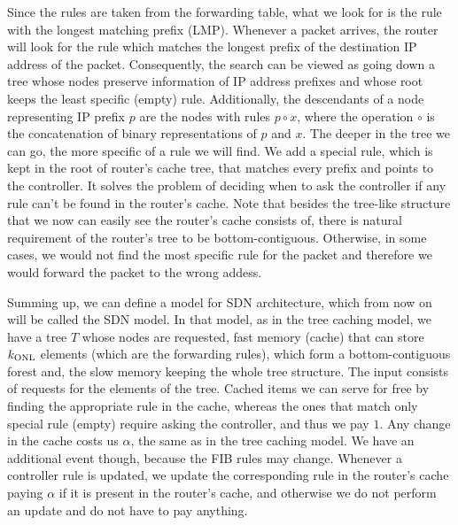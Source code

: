 Since the rules are taken from the forwarding table, what we look for is the
rule with the longest matching prefix (LMP). Whenever a packet arrives, the
router will look for the rule which matches the longest prefix of the
destination IP address of the packet. Consequently, the search can be viewed as
going down a tree whose nodes preserve information of IP address prefixes and whose
root keeps the least specific (empty) rule. Additionally, the descendants of a node
representing IP prefix $p$ are the nodes with rules $p \circ x$, where the operation
$\circ$ is the concatenation of binary representations of $p$ and $x$. The deeper in
the tree we can go, the more specific of a rule we will find. We add a special rule,
which is kept in the root of router's cache tree, that matches every prefix and
points to the controller. It solves the problem of deciding when to ask the
controller if any rule can't be found in the router's cache. Note that besides
the tree-like structure that we now can easily see the router's cache
consists of, there is natural requirement of the router's tree to be
bottom-contiguous. Otherwise, in some cases, we would not find the most specific
rule for the packet and therefore we would forward the packet to the wrong addess. 

Summing up, we can define a model for SDN architecture, which from now on will
be called the SDN model. In that model, as in the tree caching model, we have a tree
$T$ whose nodes are requested, fast memory (cache) that can store $k_{\mathrm{ONL}}$
elements (which are the forwarding rules), which form a bottom-contiguous forest
and, the slow memory keeping the whole tree structure. The input consists of
requests for the elements of the tree. Cached items we can serve for free by finding
the appropriate rule in the cache, whereas the ones that match only special rule
(empty) require asking the controller, and thus we pay $1$. Any change in the
cache costs us $\alpha$, the same as in the tree caching model. We have an
additional event though, because the FIB rules may change. Whenever a controller
rule is updated, we update the corresponding rule in the router's cache paying
$\alpha$ if it is present in the router's cache, and otherwise we do not perform
an update and do not have to pay anything.

